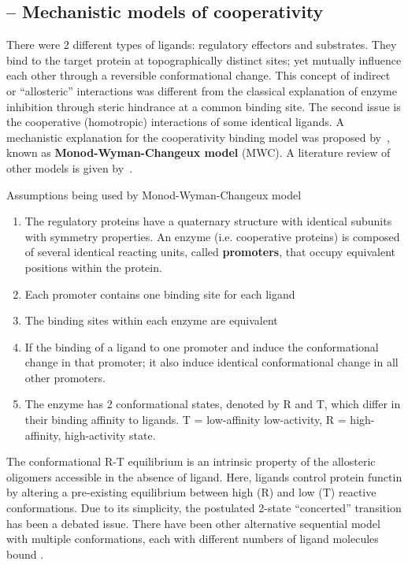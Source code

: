 \subsection{-- Mechanistic models of cooperativity}
\label{sec:mech-models-coop}

There were 2 different types of ligands: regulatory effectors and substrates.
They bind to the target protein at topographically distinct sites; yet mutually
influence each other through a reversible conformational change. This concept of
indirect or ``allosteric'' interactions was different from the classical
explanation of enzyme inhibition through steric hindrance at a common binding
site. The second issue is the cooperative (homotropic) interactions of some
identical ligands. A mechanistic explanation for the cooperativity binding model
was proposed by~\citep{monod1965nat}, known as {\bf Monod-Wyman-Changeux model}
(MWC). A literature review of other models is given by~\citep{dixon1979,
changeux2005}.


Assumptions being used by Monod-Wyman-Changeux model
\begin{enumerate}
  \item The regulatory proteins have a quaternary structure with identical
  subunits with symmetry properties. An enzyme (i.e. cooperative proteins) is
  composed of several identical reacting units, called {\bf promoters}, that occupy
  equivalent positions within the protein.
  
\item Each promoter contains one binding site for each ligand

\item The binding sites within each enzyme are equivalent

\item If the binding of a ligand to one promoter and induce the
  conformational change in that promoter; it also induce identical
  conformational change in all other promoters.
  
\item The enzyme has 2 conformational states, denoted by R and T,
  which differ in their binding affinity to ligands. T = low-affinity
  low-activity, R = high-affinity, high-activity state.
\end{enumerate}
The conformational R-T equilibrium is an intrinsic property of the allosteric
oligomers accessible in the absence of ligand. Here, ligands control protein
functin by altering a pre-existing equilibrium between high (R) and low (T)
reactive conformations.  Due to its simplicity, the postulated 2-state
``concerted'' transition has been a debated issue. There have been other
alternative sequential model with multiple conformations, each with different
numbers of ligand molecules bound \citep{viappiani2004}. 

